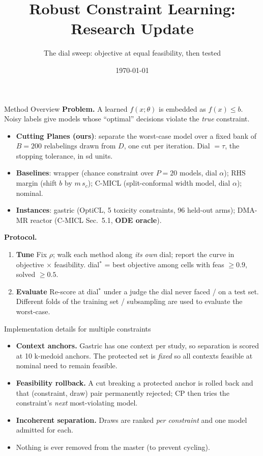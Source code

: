 \documentclass{beamer}
\title{Robust Constraint Learning: Research Update}
\subtitle{The dial sweep: objective at equal feasibility, then tested}
\date{\today}
\begin{document}
\begin{frame}{Method Overview}
    \footnotesize
    \textbf{Problem.} A learned $f(x;\theta)$ is embedded as $f(x)\le b$. Noisy
    labels give models whose ``optimal'' decisions violate the \emph{true} constraint.
    \begin{itemize}
        \item \textbf{Cutting Planes (ours)}: separate the worst-case model over a
              fixed bank of $B{=}200$ relabelings drawn from $D$, one cut per
              iteration. Dial $=\tau$, the stopping tolerance, in sd units.
        \item \textbf{Baselines}: wrapper (chance constraint over $P{=}20$ models,
              dial $\alpha$); RHS margin (shift $b$ by $m\,s_c$);
              C-MICL (split-conformal width model, dial $\alpha$); nominal.
        \item \textbf{Instances}: gastric (OptiCL, 5 toxicity constraints, 96
              held-out arms); DMA-MR reactor (C-MICL Sec.~5.1, \textbf{
              ODE oracle}).
    \end{itemize}
    \textbf{Protocol.}
    \begin{enumerate}
        \item \textbf{Tune} Fix $\rho$; walk each method along \emph{its own} dial;
              report the curve in objective $\times$ feasibility. dial$^\ast$ = best objective
              among cells with feas $\ge0.9$, solved $\ge0.5$. 
        \item \textbf{Evaluate} Re-score at dial$^\ast$ under a judge the dial never faced 
              / on a test set. Different folds of the training set / subsampling are used
              to evaluate the worst-case.
    \end{enumerate}
\end{frame}

\begin{frame}{Implementation details for multiple constraints}
    \footnotesize
    \begin{itemize}
        \item \textbf{Context anchors.} Gastric has one context per study, so
              separation is scored at 10 k-medoid anchors. The protected set is
              \emph{fixed} so all contexts feasible at nominal need to remain
              feasible.
        \item \textbf{Feasibility rollback.} A cut breaking a protected anchor is
              rolled back and that (constraint, draw) pair permanently rejected;
              CP then tries the constraint's \emph{next} most-violating model.
        \item \textbf{Incoherent separation.} Draws are
              ranked \emph{per constraint} and one model admitted for each.
        \item Nothing is ever removed from the master (to prevent cycling).
    \end{itemize}
\end{frame}
\end{document}
